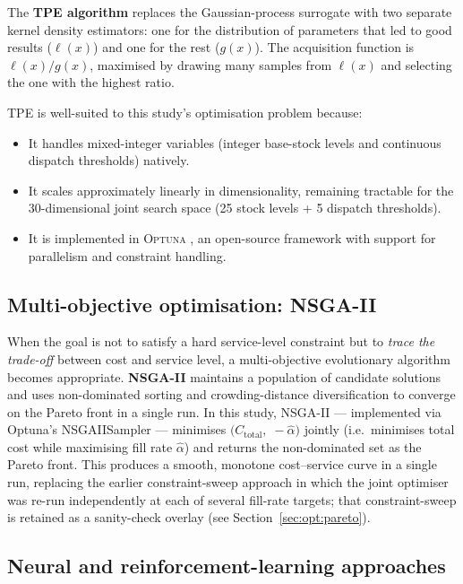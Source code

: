 The \textbf{TPE algorithm} \citep{BergstraEtAl2011} replaces the
Gaussian-process surrogate with two separate kernel density estimators:
one for the distribution of parameters that led to good results ($\ell(x)$)
and one for the rest ($g(x)$).  The acquisition function is
$\ell(x) / g(x)$, maximised by drawing many samples from $\ell(x)$ and
selecting the one with the highest ratio.

TPE is well-suited to this study's optimisation problem because:
\begin{itemize}
  \item It handles mixed-integer variables (integer base-stock levels and
        continuous dispatch thresholds) natively.
  \item It scales approximately linearly in dimensionality, remaining
        tractable for the 30-dimensional joint search space (25 stock
        levels + 5 dispatch thresholds).
  \item It is implemented in \textsc{Optuna} \citep{AkibaEtAl2019},
        an open-source framework with support for parallelism and
        constraint handling.
\end{itemize}

\subsection{Multi-objective optimisation: NSGA-II}

When the goal is not to satisfy a hard service-level constraint but to
\emph{trace the trade-off} between cost and service level, a
multi-objective evolutionary algorithm becomes appropriate.
\textbf{NSGA-II} \citep{DebEtAl2002} maintains a population of candidate
solutions and uses non-dominated sorting and crowding-distance
diversification to converge on the Pareto front in a single run.  In
this study, NSGA-II — implemented via Optuna's NSGAIISampler —
minimises $\bigl(C_{\text{total}},\;-\hat{\alpha}\bigr)$ jointly
(i.e.\ minimises total cost while maximising fill rate $\hat{\alpha}$)
and returns the non-dominated set as the Pareto front.  This produces a
smooth, monotone cost--service curve in a single run, replacing the
earlier constraint-sweep approach in which the joint optimiser was
re-run independently at each of several fill-rate targets; that
constraint-sweep is retained as a sanity-check overlay
(see Section~\ref{sec:opt:pareto}).

\subsection{Neural and reinforcement-learning approaches}
\label{sec:lit:drl}

